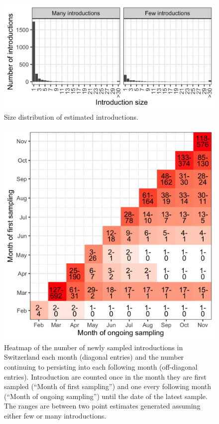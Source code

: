 \documentclass[9pt,twoside,lineno]{pnas-new}
\begin{document}
\begin{figure}[h!]
\centering
\includegraphics[width = 0.5\linewidth]{figures/chain_size_dist.png}
\caption{Size distribution of estimated introductions.}  
\label{fig:chain_size_dist}
\end{figure}

\begin{figure}[h!]
\centering
\includegraphics[width = 0.5\linewidth]{figures/chain_longevity_matrix.png}
\caption{Heatmap of the number of newly sampled introductions in Switzerland each month (diagonal entries) and the number continuing to persisting into each following month (off-diagonal entries). Introduction are counted once in the month they are first sampled (``Month of first sampling'') and one every following month (``Month of ongoing sampling'') until the date of the latest sample. The ranges are between two point estimates generated assuming either few or many introductions.}  
\label{fig:chain-longevity-matrix}
\end{figure}
\end{document}
